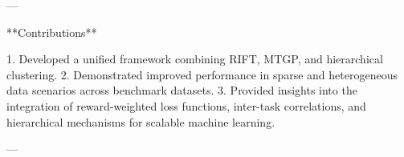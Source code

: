 ---

**Contributions**

1. Developed a unified framework combining RIFT, MTGP, and hierarchical clustering.
2. Demonstrated improved performance in sparse and heterogeneous data scenarios across benchmark datasets.
3. Provided insights into the integration of reward-weighted loss functions, inter-task correlations, and hierarchical mechanisms for scalable machine learning.

---